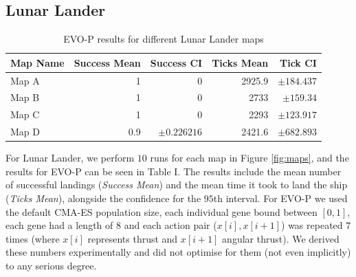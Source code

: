 \documentclass[conference]{IEEEtran}
\begin{document}
\subsection{Lunar Lander}

\begin{table}[h]
	\begin{tabular}{lrrrr}
\hline
 Map Name   &   Success Mean &   Success CI &   Ticks Mean &   Tick CI \\
\hline
 Map A       &            1   &     0        &       2925.9 &   $\pm 184.437$ \\
 Map B  &            1   &     0        &       2733   &   $\pm 159.34$  \\
 Map C  &            1   &     0        &       2293   &   $\pm 123.917$ \\
 Map D  &            0.9 &     $\pm 0.226216$ &       2421.6 &   $\pm 682.893$ \\
\hline
\end{tabular}
\label{tb:results}
\caption{EVO-P results for different Lunar Lander maps}
\end{table}


For Lunar Lander, we perform $10$ runs for each map in Figure \ref{fig:maps}, and the results for EVO-P can be seen in Table I. The results include the mean number of successful landings (\emph{Success Mean}) and the mean time it took to land the ship (\emph{Ticks Mean}), alongside the confidence for the $95$th interval.   For EVO-P we used the default CMA-ES population size, each individual gene bound between $[0,1]$, each gene had a length of $8$ and each action pair ($x[i], x[i+1]$) was repeated $7$ times (where $x[i]$ represents thrust and $x[i+1]$ angular thrust). We derived these numbers experimentally and did not optimise for them (not even implicitly) to any serious degree.  
\end{document}
